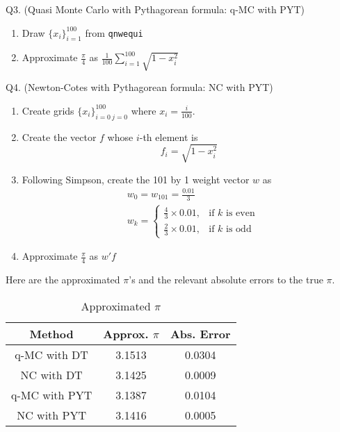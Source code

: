 \documentclass[10pt, letterpaper]{article}
\begin{document}
\noindent Q3. (Quasi Monte Carlo with Pythagorean formula: q-MC with PYT)

\begin{enumerate}
\item Draw $\{ x_{i}\}_{i=1}^{100}$ from \texttt{qnwequi}
\item Approximate $\frac{\pi}{4}$ as $\frac{1}{100}\sum_{i=1}^{100}\sqrt{1-x_{i}^{2}}$
\end{enumerate}

\newpage

\noindent Q4. (Newton-Cotes with Pythagorean formula: NC with PYT)

\begin{enumerate}
\item Create grids $\{ x_{i} \}_{i=0 ~ j=0}^{100}$ where $x_{i} = \frac{i}{100}$.
\item Create the vector $f$ whose $i$-th element is 
   \begin{equation}
    f_{i}=\sqrt{1-x_{i}^{2}} \nonumber
  \end{equation} 
\item Following Simpson, create the 101 by 1 weight vector $w$ as
   \begin{align}
    &  w_{0}=w_{101} = \frac{0.01}{3} \nonumber \\    
    &  w_{k} = 
    \begin{cases}
      \frac{4}{3} \times 0.01, & \text{if $k$ is even} \nonumber \\
      \frac{2}{3} \times 0.01, & \text{if $k$ is odd}
    \end{cases}
  \end{align} 
\item Approximate $\frac{\pi}{4}$ as $w'f$
\end{enumerate}

Here are the approximated $\pi$'s and the relevant absolute errors to the true $\pi$.
\begin{table}[h!]
  \begin{center}
    \caption{Approximated $\pi$}  
    \label{tab:estimate}
    \begin{tabular}{c|c|c} %
      \hline\hline
       Method                & Approx. $\pi$     &   Abs. Error    \\
      \hline
       q-MC with DT          & 3.1513           &  0.0304          \\
       NC with DT            & 3.1425           &  0.0009         \\ 
       q-MC with PYT         & 3.1387           &  0.0104          \\
       NC with PYT           & 3.1416           &  0.0005          \\ 
      \hline      \hline
    \end{tabular}
  \end{center}
\end{table} 
\end{document}
